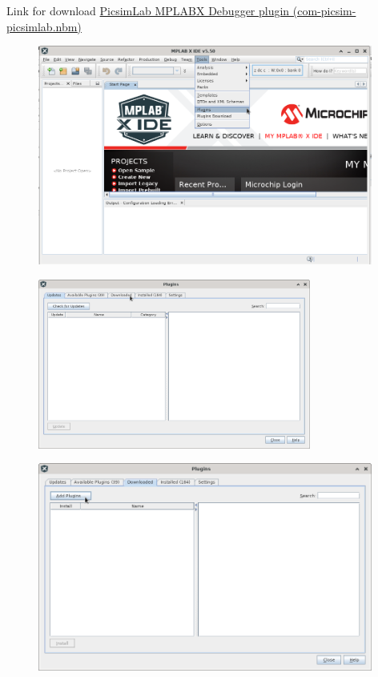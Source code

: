 Link for download \href{https://github.com/lcgamboa/picsimlab_md/releases}{PicsimLab MPLABX Debugger plugin (com-picsim-picsimlab.nbm)} 

\begin{figure}[H]
\center
\includegraphics[width=0.98\textwidth]{img/hmd/mplab01.png} 
\end{figure} 

\begin{figure}[H]
\center
\includegraphics[width=0.8\textwidth]{img/hmd/mplab02.png} 
\end{figure} 

\begin{figure}[H]
\center
\includegraphics[width=0.98\textwidth]{img/hmd/mplab03.png} 
\end{figure} 

